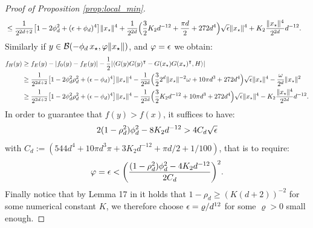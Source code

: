\begin{proof}[Proof of Proposition \ref{prop:local_min}]
\[\begin{aligned}
	&\leq \frac{1}{2^{2d +2}} \big[ 1 - 2 \phi_d^2 + (\epsilon + \phi_d)^4 \big]  \|{x_{\star}}\|^4 
	+\frac{1}{2^{2d}}\Big(\frac{3}{2} K_2 d^{-12} +  \frac{\pi d}{2} + 272 d^4 \Big)\sqrt{\epsilon} \|{x_{\star}}\|^4  + K_2 \frac{\|{x_{\star}}\|^4}{2^{2d}} d^{-12}.
	\end{aligned}
	\]
	Similarly if $y \in \mathcal{B}(- \phi_d \,{x_{\star}}, \varphi \|{x_{\star}}\|)$, and $\varphi = \epsilon$ we obtain:
	\[
	\begin{aligned}
	f_H(y) &\geq f_E(y) - |f_0(y) - f_E(y)| - \frac{1}{2}  |\langle G(y) G(y)^\intercal - G({x_{\star}})G({x_{\star}})^\intercal, H \rangle | \\
	&\geq \frac{1}{2^{2d +2}} \big[ 1 - 2 \phi_d^2 \rho_d^2 + (\epsilon - \phi_d)^4 \big]  \|{x_{\star}}\|^4 
	- \frac{1}{2^{2d}} \Big( \frac{3}{2} 2^d \|{x_{\star}}\|^{-2} \omega +  10 \pi d^3 + 272 d^4 \Big)\sqrt{\epsilon} \|{x_{\star}}\|^4  - \frac{\omega }{2^{d}}\|{x_{\star}}\|^2
	\\&\geq \frac{1}{2^{2d +2}} \big[ 1 - 2 \phi_d^2 \rho_d^2 + (\epsilon - \phi_d)^4 \big]  \|{x_{\star}}\|^4 
	- \frac{1}{2^{2d}} \Big( \frac{3}{2} K_2 d^{-12} +  10 \pi d^3 + 272 d^4 \Big)\sqrt{\epsilon} \|{x_{\star}}\|^4  - K_2 \frac{\|{x_{\star}}\|^4}{2^{2d}} d^{-12}.
	\end{aligned}
	\]
	In order to guarantee that $f(y) > f(x)$, it suffices to have:
	\[
	2 (1 - \rho_d^2) \phi_d^2 -  8 K_2 d^{-12} > 4 C_d \sqrt{\epsilon}
	\]
	with $C_d := (544 d^4 + 10 \pi d^3 \pi + 3 K_2 d^{-12} + \pi d/2 + 1/100)$,
	that is to
	require:
	\[
	\varphi = {\epsilon} < \bigg( \frac{(1 - \rho_d^2) \phi_d^2 - 4 K_2 d^{-12}}{2 C_d} \bigg)^2.
	\]
	Finally notice that by Lemma 17 in \cite{HHHV18} it holds that $1- \rho_d \geq (K (d +2))^{-2}$ for some numerical constant $K$, we  therefore choose 
	$\epsilon = \varrho/d^{12}$ for some $\varrho >0$ small enough.
\end{proof}